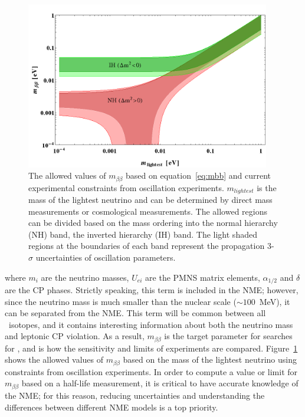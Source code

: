 \documentclass[/main.tex]{subfiles}
\begin{document}
\begin{itemize}
\begin{equation}
  \end{equation}
  \begin{figure}[p]
    \centering
    \includegraphics[width=0.95\textwidth]{lobsterplot}
    \caption[Allowed values of $m_{\beta\beta}$]{\label{fig:lobsterplot}
      The allowed values of $m_{\beta\beta}$ based on equation~\ref{eq:mbb} and current experimental constraints from oscillation experiments. $m_{lightest}$ is the mass of the lightest neutrino and can be determined by direct mass measurements or cosmological measurements. The allowed regions can be divided based on the mass ordering into the normal hierarchy (NH) band, the inverted hierarchy (IH) band. The light shaded regions at the boundaries of each band represent the propagation 3-$\sigma$ uncertainties of oscillation parameters\cite{lobsterplot}.
    }
  \end{figure}
  where $m_i$ are the neutrino masses, $U_{ei}$ are the PMNS matrix elements, $\alpha_{1/2}$ and $\delta$ are the CP phases.
  Strictly speaking, this term is included in the NME; however, since the neutrino mass is much smaller than the nuclear scale (${\sim}100$~MeV), it can be separated from the NME.
  This term will be common between all \znbb\ isotopes, and it contains interesting information about both the neutrino mass and leptonic CP violation.
  As a result, $m_{\beta\beta}$ is the target parameter for searches for \znbb, and is how the sensitivity and limits of experiments are compared.
  Figure~\ref{fig:lobsterplot} shows the allowed values of $m_{\beta\beta}$ based on the mass of the lightest neutrino using constraints from oscillation experiments.
  In order to compute a value or limit for $m_{\beta\beta}$ based on a half-life measurement, it is critical to have accurate knowledge of the NME; for this reason, reducing uncertainties and understanding the differences between different NME models is a top priority.

\end{itemize}
\end{document}
